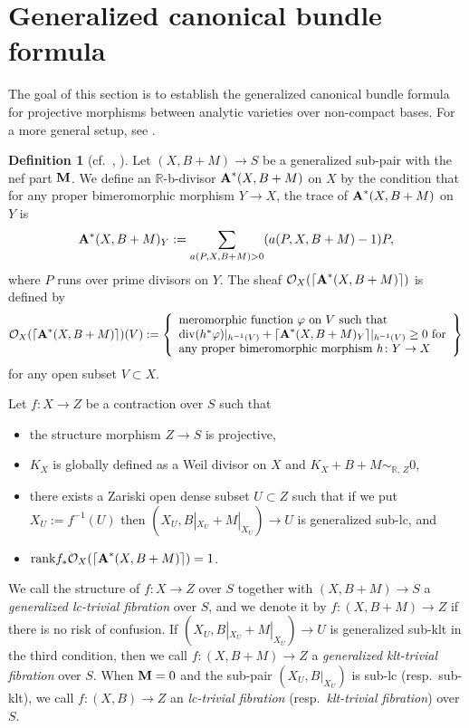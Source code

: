 \documentclass[12pt]{amsart}
\theoremstyle{definition}
\newtheorem{defn}[thm]{Definition}
\begin{document}
\section{Generalized canonical bundle formula}\label{sec--gen-can-bundle-formula}

The goal of this section is to establish the generalized canonical bundle formula for projective morphisms between analytic varieties over non-compact bases. 
For a more general setup, see \cite[Conjecture 2.1]{haconpaun}. 



\begin{defn}[{cf.~\cite[Section 4]{filipazzi-gen-can-bundle-formula}, \cite[Subsection 2.5]{filipazzi-svaldi}}]\label{defn--can-bundle-formula}
Let $(X,B+M) \to S$ be a generalized sub-pair with the nef part $\boldsymbol{\rm M}$.  
We define an $\mathbb{R}$-b-divisor $\boldsymbol{\rm A}^{*}(X,B+M)$ on $X$ by the condition that for any proper bimeromorphic morphism $Y \to X$, the trace of $\boldsymbol{\rm A}^{*}(X,B+M)$ on $Y$ is 
$$\boldsymbol{\rm A}^{*}(X,B+M)_{Y}:=\sum_{a(P,X,B+M)>0}(a(P,X,B+M)-1)P,$$
where $P$ runs over prime divisors on $Y$. 
The sheaf $\mathcal{O}_{X}(\lceil \boldsymbol{\rm A}^{*}(X,B+M)\rceil)$ is defined by
$$\mathcal{O}_{X}(\lceil \boldsymbol{\rm A}^{*}(X,B+M)\rceil)(V):=\left\{
\begin{array}{l}
\text{meromorphic function $\varphi$ on $V$ such that}\\
\text{${\rm div}(h^{*}\varphi)|_{h^{-1}(V)}+\lceil \boldsymbol{\rm A}^{*}(X,B+M)_{Y}\rceil|_{h^{-1}(V)} \geq 0$ for}\\
\text{any proper bimeromorphic morphism $h \colon Y \to X$}
\end{array}\right\}$$
for any open subset $V \subset X$. 

Let $f \colon X \to Z$ be a contraction over $S$ such that 
\begin{itemize}
\item
the structure morphism $Z \to S$ is projective, 
\item
$K_{X}$ is globally defined as a Weil divisor on $X$ and $K_{X}+B+M \sim_{\mathbb{R},\,Z}0$, 
\item
there exists a Zariski open dense subset $U \subset Z$ such that if we put $X_{U}:=f^{-1}(U)$ then
 $(X_{U},B|_{X_{U}}+M|_{X_{U}}) \to U$ is generalized sub-lc, and
 \item
${\rm rank}f_{*}\mathcal{O}_{X}(\lceil \boldsymbol{\rm A}^{*}(X,B+M)\rceil)=1$.
\end{itemize}
We call the structure of $f \colon X \to Z$ over $S$ together with $(X,B+M) \to S$ a {\em generalized lc-trivial fibration} over $S$, and we denote it by $f\colon (X,B+M) \to Z$ if there is no risk of confusion. 
If $(X_{U},B|_{X_{U}}+M|_{X_{U}}) \to U$ is generalized sub-klt in the third condition, then we call $f\colon (X,B+M) \to Z$ a {\em generalized klt-trivial fibration} over $S$. 
When $\boldsymbol{\rm M}=0$ and the sub-pair $(X_{U},B|_{X_{U}})$ is sub-lc (resp.~sub-klt), we call $f\colon (X,B) \to Z$  an {\em lc-trivial fibration} (resp.~{\em klt-trivial fibration}) over $S$. 


\end{defn}
\end{document}
